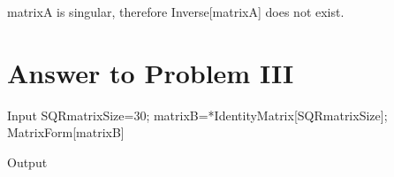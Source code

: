 \documentclass[11pt,a4paper]{article}
\begin{document}
matrixA is singular, therefore Inverse[matrixA] does not exist.

\clearpage
\section{Answer to Problem III}\label{sec:P03}

\begin{mmaCell}[moredefined={SQRmatrixSize, matrixB}]{Input}
SQRmatrixSize=30;
matrixB=\mmaDef{\(\pmb{\pi}\)}*IdentityMatrix[SQRmatrixSize];
MatrixForm[matrixB]
\end{mmaCell}

\begin{mmaCell}[form=MatrixForm]{Output}

\end{mmaCell}
\end{document}

